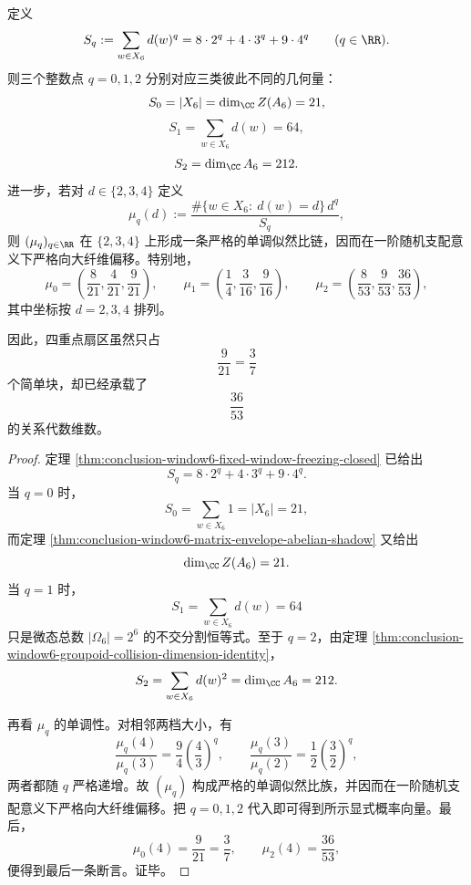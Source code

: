 \begin{theorem}\label{thm:conclusion-window6-qmoment-triple-geometry}
定义
\[
S_q:=\sum_{w\in X_6}d(w)^q
=
8\cdot 2^q+4\cdot 3^q+9\cdot 4^q
\qquad(q\in\RR).
\]
则三个整数点 \(q=0,1,2\) 分别对应三类彼此不同的几何量：
\[
S_0
=
|X_6|
=
\dim_{\CC}Z(A_6)
=
21,
\]
\[
S_1
=
\sum_{w\in X_6}d(w)
=
64,
\]
\[
S_2
=
\dim_{\CC}A_6
=
212.
\]
进一步，若对 \(d\in\{2,3,4\}\) 定义
\[
\mu_q(d):=\frac{\#\{w\in X_6:\ d(w)=d\}\,d^q}{S_q},
\]
则 \((\mu_q)_{q\in\RR}\) 在 \(\{2,3,4\}\) 上形成一条严格的单调似然比链，因而在一阶随机支配意义下严格向大纤维偏移。特别地，
\[
\mu_0=\left(\frac{8}{21},\frac{4}{21},\frac{9}{21}\right),
\qquad
\mu_1=\left(\frac14,\frac{3}{16},\frac{9}{16}\right),
\qquad
\mu_2=\left(\frac{8}{53},\frac{9}{53},\frac{36}{53}\right),
\]
其中坐标按 \(d=2,3,4\) 排列。

因此，四重点扇区虽然只占
\[
\frac{9}{21}=\frac37
\]
个简单块，却已经承载了
\[
\frac{36}{53}
\]
的关系代数维数。
\end{theorem}
\begin{proof}
定理 \ref{thm:conclusion-window6-fixed-window-freezing-closed} 已给出
\[
S_q=8\cdot 2^q+4\cdot 3^q+9\cdot 4^q.
\]
当 \(q=0\) 时，
\[
S_0=\sum_{w\in X_6}1=|X_6|=21,
\]
而定理 \ref{thm:conclusion-window6-matrix-envelope-abelian-shadow} 又给出
\[
\dim_{\CC}Z(A_6)=21.
\]
当 \(q=1\) 时，
\[
S_1=\sum_{w\in X_6}d(w)=64
\]
只是微态总数 \(|\Omega_6|=2^6\) 的不交分割恒等式。至于 \(q=2\)，由定理 \ref{thm:conclusion-window6-groupoid-collision-dimension-identity}，
\[
S_2=\sum_{w\in X_6}d(w)^2=\dim_{\CC}A_6=212.
\]

再看 \(\mu_q\) 的单调性。对相邻两档大小，有
\[
\frac{\mu_q(4)}{\mu_q(3)}
=
\frac{9}{4}\left(\frac43\right)^q,
\qquad
\frac{\mu_q(3)}{\mu_q(2)}
=
\frac12\left(\frac32\right)^q,
\]
两者都随 \(q\) 严格递增。故 \((\mu_q)\) 构成严格的单调似然比族，并因而在一阶随机支配意义下严格向大纤维偏移。把 \(q=0,1,2\) 代入即可得到所示显式概率向量。最后，
\[
\mu_0(4)=\frac{9}{21}=\frac37,
\qquad
\mu_2(4)=\frac{36}{53},
\]
便得到最后一条断言。证毕。
\end{proof}

